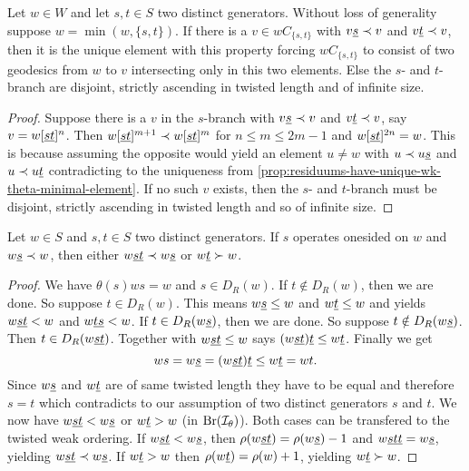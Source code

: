 \begin{prop}
	Let $w \in W$ and let $s,t \in S$ two distinct generators. Without loss of generality suppose $w = \min(w, \{s,t\})$. If there is a $v \in wC_{\{s,t\}}$ with $v \underline{s} \prec v$ and $v \underline{t} \prec v$, then it is the unique element with this property forcing $wC_{\{s,t\}}$ to consist of two geodesics from $w$ to $v$ intersecting only in this two elements. Else the $s$- and $t$-branch are disjoint, strictly ascending in twisted length and of infinite size.

	\begin{proof}
		Suppose there is a $v$ in the $s$-branch with $v \underline{s} \prec v$ and $v \underline{t} \prec v$, say $v = w[\underline{s} \underline{t}]^n$. Then $w[\underline{s} \underline{t}]^{m+1} \prec w[\underline{s} \underline{t}]^m$ for $n \leq m \leq 2m - 1$ and $w[\underline{s} \underline{t}]^{2n} = w$. This is because assuming the opposite would yield an element $u \neq w$ with $u \prec u \underline{s}$ and $u \prec u \underline{t}$ contradicting to the uniqueness from \ref{prop:residuums-have-unique-wk-theta-minimal-element}. If no such $v$ exists, then the $s$- and $t$-branch must be disjoint, strictly ascending in twisted length and so of infinite size.
	\end{proof}
\end{prop}

\begin{prop}
	Let $w \in S$ and $s,t \in S$ two distinct generators. If $s$ operates onesided on $w$ and $w \underline{s} \prec w$, then either $w \underline{st} \prec w \underline{s}$ or $w \underline{t} \succ w$.

	\begin{proof}
		We have $\theta(s)ws = w$ and $s \in D_R(w)$. If $t \notin D_R(w)$, then we are done. So suppose $t \in D_R(w)$. This means $w \underline{s} \leq w$ and $w \underline{t} \leq w$ and \cite[Lemma 3.9]{hultman:comb-twisted-invo} yields $w \underline{st} < w$ and $w \underline{ts} < w$. If $t \in D_R(w \underline{s})$, then we are done. So suppose $t \notin D_R(w \underline{s})$. Then $t \in D_R(w \underline{st})$. Together with $w \underline{st} \leq w$ \cite[Lemma 3.9(2)]{hultman:comb-twisted-invo} says $(w \underline{st}) \underline{t} \leq w \underline{t}$. Finally we get
		$$ ws = w \underline{s} = (w \underline{st}) \underline{t} \leq w \underline{t} = wt.$$
		Since $w \underline{s}$ and $w \underline{t}$ are of same twisted length they have to be equal and therefore $s = t$ which contradicts to our assumption of two distinct generators $s$ and $t$. We now have $w \underline{s} \underline{t} < w \underline{s}$ or $w \underline{t} > w$ (in $\operatorname{Br}(\mathcal{I}_{\theta})$). Both cases can be transfered to the twisted weak ordering. If $w \underline{s} \underline{t} < w \underline{s}$, then $\rho(w \underline{s} \underline{t}) = \rho(w \underline{s}) - 1$ and $w \underline{s} \underline{t} \underline{t} = w \underline{s}$, yielding $w \underline{s} \underline{t} \prec w \underline{s}$. If $w \underline{t} > w$ then $\rho(w \underline{t}) = \rho(w) + 1$, yielding $w \underline{t} \succ w$.
	\end{proof}
\end{prop}

